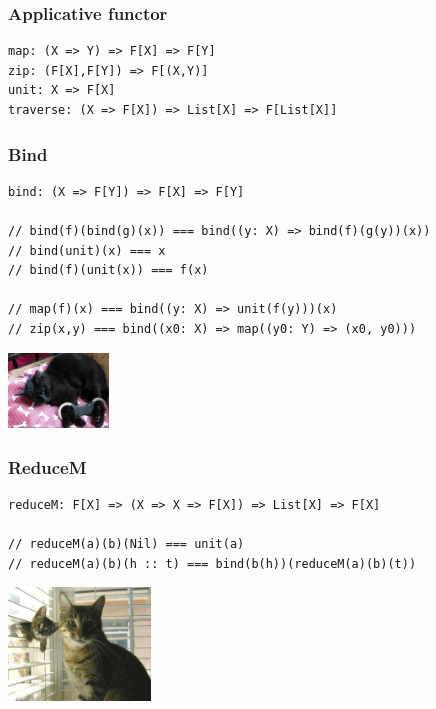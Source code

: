 \documentclass{beamer}
\begin{document}
\begin{frame}[fragile]
\frametitle{Applicative functor}
\begin{lstlisting}
map: (X => Y) => F[X] => F[Y]
zip: (F[X],F[Y]) => F[(X,Y)]
unit: X => F[X]
traverse: (X => F[X]) => List[X] => F[List[X]]
\end{lstlisting}
\end{frame}

\begin{frame}[fragile]
\frametitle{Bind}
\begin{lstlisting}
bind: (X => F[Y]) => F[X] => F[Y]

// bind(f)(bind(g)(x)) === bind((y: X) => bind(f)(g(y))(x))
// bind(unit)(x) === x
// bind(f)(unit(x)) === f(x)

// map(f)(x) === bind((y: X) => unit(f(y)))(x)
// zip(x,y) === bind((x0: X) => map((y0: Y) => (x0, y0)))
\end{lstlisting}
\begin{center} \includegraphics[height=2cm]{cat_bind.jpg} \end{center}
\end{frame}

\begin{frame}[fragile]
\frametitle{ReduceM}
\begin{lstlisting}
reduceM: F[X] => (X => X => F[X]) => List[X] => F[X]

// reduceM(a)(b)(Nil) === unit(a)
// reduceM(a)(b)(h :: t) === bind(b(h))(reduceM(a)(b)(t))
\end{lstlisting}
\begin{center} \includegraphics[height=3cm]{cat_reduce.jpg} \end{center}
\end{frame}
\end{document}
